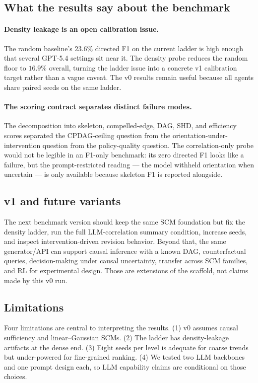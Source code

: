\subsection{What the results say about the benchmark}

\paragraph{Density leakage is an open calibration issue.} The random baseline's $23.6\%$ directed F1 on the current ladder is high enough that several GPT-5.4 settings sit near it. The density probe reduces the random floor to $16.9\%$ overall, turning the ladder issue into a concrete v1 calibration target rather than a vague caveat. The v0 results remain useful because all agents share paired seeds on the same ladder.

\paragraph{The scoring contract separates distinct failure modes.} The decomposition into skeleton, compelled-edge, DAG, SHD, and efficiency scores separated the CPDAG-ceiling question from the orientation-under-intervention question from the policy-quality question. The correlation-only probe would not be legible in an F1-only benchmark: its zero directed F1 looks like a failure, but the prompt-restricted reading --- the model withheld orientation when uncertain --- is only available because skeleton F1 is reported alongside.

\subsection{v1 and future variants}
\label{sec:future-scm-ladder}

The next benchmark version should keep the same SCM foundation but fix the density ladder, run the full LLM-correlation summary condition, increase seeds, and inspect intervention-driven revision behavior. Beyond that, the same generator/API can support causal inference with a known DAG, counterfactual queries, decision-making under causal uncertainty, transfer across SCM families, and RL for experimental design. Those are extensions of the scaffold, not claims made by this v0 run.

\subsection{Limitations}

Four limitations are central to interpreting the results. (1) v0 assumes causal sufficiency and linear--Gaussian SCMs. (2) The ladder has density-leakage artifacts at the dense end. (3) Eight seeds per level is adequate for coarse trends but under-powered for fine-grained ranking. (4) We tested two LLM backbones and one prompt design each, so LLM capability claims are conditional on those choices.
